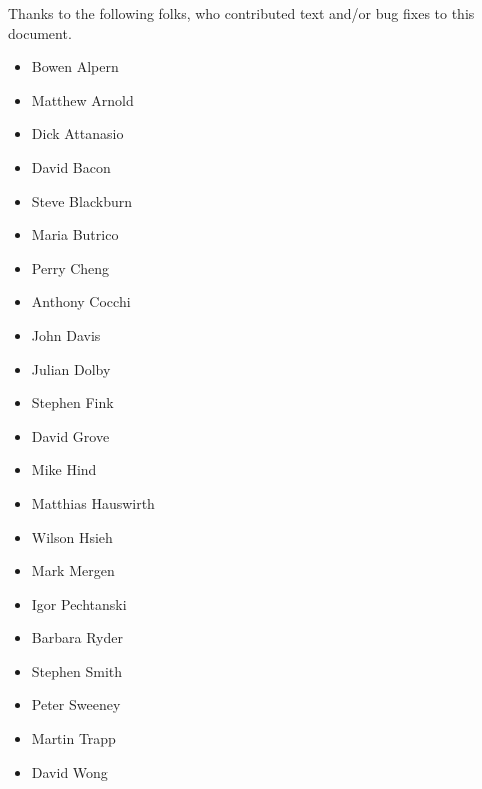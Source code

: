 Thanks to the following folks, who contributed text and/or bug fixes to
this document.

\begin{itemize}
\item Bowen Alpern
\item Matthew Arnold
\item Dick Attanasio
\item David Bacon
\item Steve Blackburn
\item Maria Butrico
\item Perry Cheng
\item Anthony Cocchi
\item John Davis
\item Julian Dolby
\item Stephen Fink
\item David Grove
\item Mike Hind
\item Matthias Hauswirth
\item Wilson Hsieh
\item Mark Mergen
\item Igor Pechtanski
\item Barbara Ryder
\item Stephen Smith
\item Peter Sweeney
\item Martin Trapp
\item David Wong
\end{itemize}

